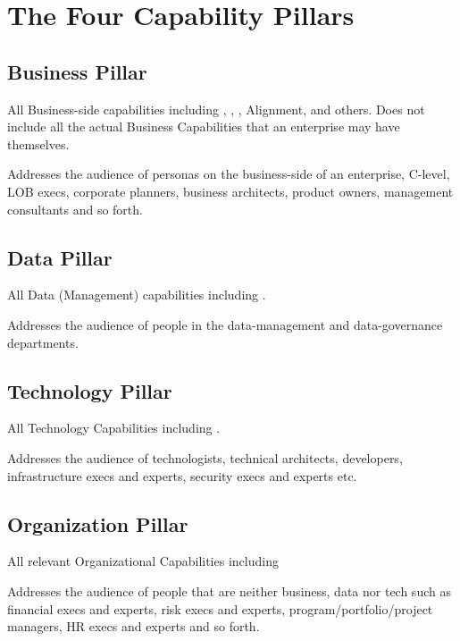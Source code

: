 \section{The Four Capability Pillars}


\subsection{Business Pillar}

All Business-side capabilities including ,
 ,
 , Alignment,
 and others.
Does not include all the actual Business Capabilities  that
an enterprise may have themselves.

Addresses the audience of personas on the business-side of an enterprise, C-level, LOB execs, corporate planners,
business architects, product owners, management consultants and so forth.

\subsection{Data Pillar}

All Data (Management) capabilities including .

Addresses the audience of people in the data-management and data-governance departments.

\subsection{Technology Pillar}

All Technology Capabilities including .

Addresses the audience of technologists, technical architects, developers, infrastructure execs and experts,
security execs and experts etc.

\subsection{Organization Pillar}

All relevant Organizational Capabilities including 

Addresses the audience of people that are neither business, data nor tech such as financial execs and experts, risk
execs and experts, program/portfolio/project managers, HR execs and experts and so forth.

